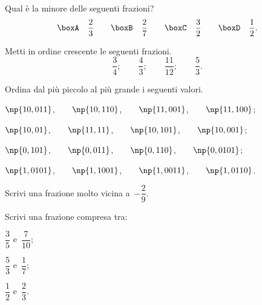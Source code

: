  \begin{esercizio}
\label{ese:3.34}
Qual è la minore delle seguenti frazioni?
\[\boxA\quad\frac{2}{3}\qquad
\boxB\quad\frac{2}{7}\qquad
\boxC\quad\frac{3}{2}\qquad
\boxD\quad\frac{1}{2}.\]
\end{esercizio}

\begin{esercizio}
\label{ese:3.35}
Metti in ordine crescente le seguenti frazioni.
\[\frac{3}{4};\qquad\frac{4}{3};\qquad\frac{11}{12};\qquad\frac{5}{3}.\]
\end{esercizio}

\begin{esercizio}
 \label{ese:3.36}
Ordina dal più piccolo al più grande i seguenti valori.
\begin{enumeratea}
\item $\np{10,011}$,$\qquad\np{10,110}$,$\qquad\np{11,001}$,$\qquad\np{11,100}$;
\item $\np{10,01}$,$\qquad\np{11,11}$,$\qquad\np{10,101}$,$\qquad\np{10,001}$;
\item $\np{0,101}$,$\qquad\np{0,011}$,$\qquad\np{0,110}$,$\qquad\np{0,0101}$;
\item $\np{1,0101}$,$\qquad\np{1,1001}$,$\qquad\np{1,0011}$,$\qquad\np{1,0110}$.
\end{enumeratea}
\end{esercizio}

\begin{esercizio}
\label{ese:3.37}
Scrivi una frazione molto vicina a~$-\dfrac{2}{9}.$
\end{esercizio}

\begin{esercizio}
\label{ese:3.38}
Scrivi una frazione compresa tra:
\begin{multicols}{3}
\begin{enumeratea}
\item $\dfrac{3}{5}$ e~$\dfrac{7}{10}$;
\item $\dfrac{5}{3}$ e~$\dfrac{1}{7}$;
\item $\dfrac{1}{2}$ e~$\dfrac{2}{3}$.
\end{enumeratea}
\end{multicols}
\end{esercizio}

